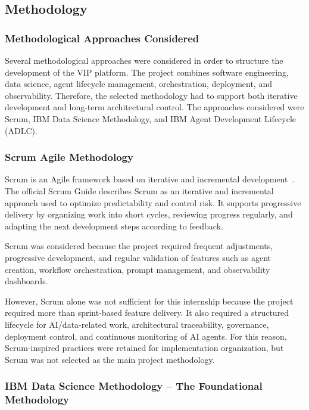 \subsection{Methodology}

\subsubsection{Methodological Approaches Considered}

Several methodological approaches were considered in order to structure the development of the VIP platform. The project combines software engineering, data science, agent lifecycle management, orchestration, deployment, and observability. Therefore, the selected methodology had to support both iterative development and long-term architectural control. The approaches considered were Scrum, IBM Data Science Methodology, and IBM Agent Development Lifecycle (ADLC).

\subsubsection{Scrum Agile Methodology}

Scrum is an Agile framework based on iterative and incremental development~\cite{scrumguide2020}. The official Scrum Guide describes Scrum as an iterative and incremental approach used to optimize predictability and control risk. It supports progressive delivery by organizing work into short cycles, reviewing progress regularly, and adapting the next development steps according to feedback.

Scrum was considered because the project required frequent adjustments, progressive development, and regular validation of features such as agent creation, workflow orchestration, prompt management, and observability dashboards.

However, Scrum alone was not sufficient for this internship because the project required more than sprint-based feature delivery. It also required a structured lifecycle for AI/data-related work, architectural traceability, governance, deployment control, and continuous monitoring of AI agents. For this reason, Scrum-inspired practices were retained for implementation organization, but Scrum was not selected as the main project methodology.

\subsubsection{IBM Data Science Methodology -- The Foundational Methodology}

